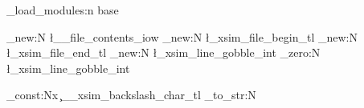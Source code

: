 % 
% 
% 
% 
% 

\xsim_load_modules:n {base}

\iow_new:N  \l__file_contents_iow
\tl_new:N   \l_xsim_file_begin_tl
\tl_new:N   \l_xsim_file_end_tl
\int_new:N  \l_xsim_line_gobble_int
\int_zero:N \l_xsim_line_gobble_int

\tl_const:Nx \c__xsim_backslash_char_tl { \cs_to_str:N \\ }

